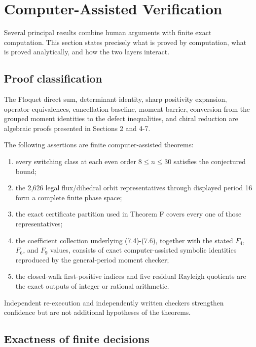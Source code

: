 \section{Computer-Assisted Verification}

Several principal results combine human arguments with finite exact
computation. This section states precisely what is proved by computation, what
is proved analytically, and how the two layers interact.

\subsection{Proof classification}

The Floquet direct sum, determinant identity, sharp positivity expansion,
operator equivalences, cancellation baseline, moment barrier, conversion from
the grouped moment identities to the defect inequalities, and chiral reduction
are algebraic proofs presented in Sections 2 and 4-7.

The following assertions are finite computer-assisted theorems:

\begin{enumerate}
\item every switching class at each even order \(8\le n\le 30\) satisfies the conjectured bound;
\item the 2,626 legal flux/dihedral orbit representatives through displayed period 16 form a complete finite phase space;
\item the exact certificate partition used in Theorem F covers every one of those representatives;
\item the coefficient collection underlying (7.4)-(7.6), together with the stated \(F_4\), \(F_6\), and \(F_9\) values, consists of exact computer-assisted symbolic identities reproduced by the general-period moment checker;
\item the closed-walk first-positive indices and five residual Rayleigh quotients are the exact outputs of integer or rational arithmetic.
\end{enumerate}

Independent re-execution and independently written checkers strengthen
confidence but are not additional hypotheses of the theorems.

\subsection{Exactness of finite decisions}

